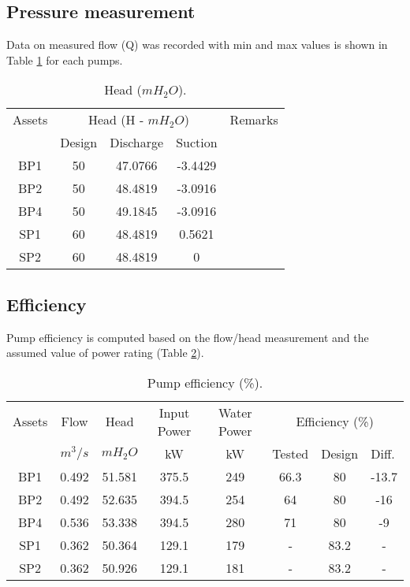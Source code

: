\subsection{Pressure measurement} \label{ch04pressure}

Data on measured flow (Q) was recorded with min and max values is shown in Table \ref{ch04_tbl_flow02} for each pumps. %

\begin{table}[!h]
	\caption{Head ($mH_2O$).}
	\label{ch04_tbl_flow02}
	{\footnotesize
\begin{tabular}{c|c|c|c|l}
\hline
Assets & \multicolumn{3}{c|}{Head (H - $mH_2O$)} & Remarks \\ 
\cline{2-4}
 & Design & Discharge & Suction &  \\ 
\hline
BP1 & 50 & 47.0766 & -3.4429 &  \\ 
BP2 & 50 & 48.4819 & -3.0916 &  \\ 
BP4 & 50 & 49.1845 & -3.0916 &  \\ 
SP1 & 60 & 48.4819 & 0.5621 &  \\ 
SP2 & 60 & 48.4819 & 0 &  \\ 
\hline
\end{tabular}

	}
\end{table}


\subsection{Efficiency}

Pump efficiency is computed based on the flow/head measurement and the assumed value of power rating (Table \ref{ch05_tbl_efficiency}). 
\begin{table}[!h]
	\caption{Pump efficiency (\%).}
	\label{ch05_tbl_efficiency}
	{\footnotesize

		
	\begin{tabular}{c|c|c|c|c|c|l|l}
\hline
Assets & Flow & Head & Input Power & Water Power & \multicolumn{3}{c}{Efficiency (\%)} \\ 
\cline{6-8}
 & $m^3/s$ & $mH_2O$ & kW & kW & Tested & Design & Diff. \\ 
\hline
BP1 & 0.492 & 51.581 & 375.5 & 249 & 66.3 & \multicolumn{1}{c|}{80} & \multicolumn{1}{c}{-13.7} \\ 
BP2 & 0.492 & 52.635 & 394.5 & 254 & 64 & \multicolumn{1}{c|}{80} & \multicolumn{1}{c}{-16} \\ 
BP4 & 0.536 & 53.338 & 394.5 & 280 & 71 & \multicolumn{1}{c|}{80} & \multicolumn{1}{c}{-9} \\ 
SP1 & 0.362 & 50.364 & 129.1 & 179 & - & \multicolumn{1}{c|}{83.2} & \multicolumn{1}{c}{-} \\ 
SP2 & 0.362 & 50.926 & 129.1 & 181 & - & \multicolumn{1}{c|}{83.2} & \multicolumn{1}{c}{-} \\ 
\hline
\end{tabular}


	}
\end{table}


